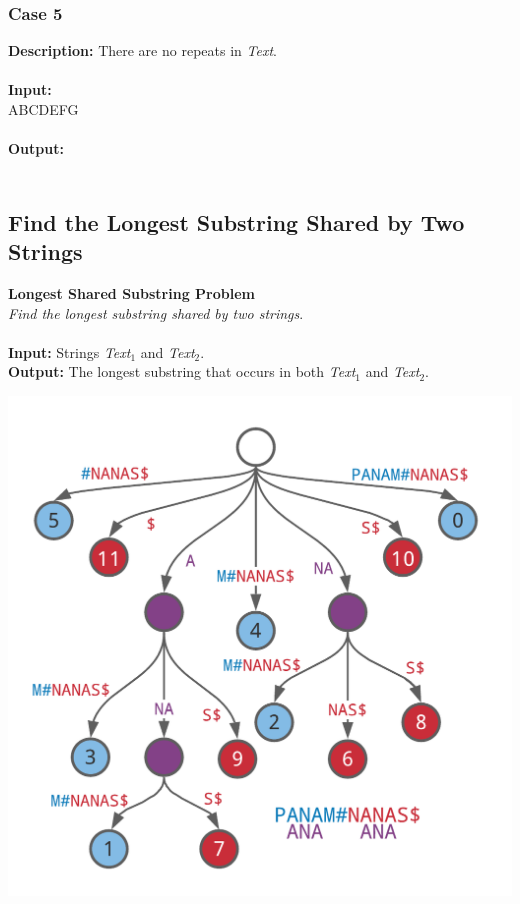 \documentclass{article}
\newcommand{\code}[1]{{\fontfamily{pcr}\selectfont #1}}
\begin{document}
\subsubsection*{Case 5}
\hline \vspace{5}
\textbf{Description:} There are no repeats in \emph{Text}.\\ \\
\noindent \textbf{Input:} \\
\code{ABCDEFG}\\ \\
\noindent \textbf{Output:}\\
\\

\pagebreak
\subsection{Find the Longest Substring Shared by Two Strings}
\hline\vspace{5}
\textbf{Longest Shared Substring Problem}\\
\emph{Find the longest substring shared by two strings}.\\ \\
\textbf{Input:} Strings \emph{Text}$_1$ and \emph{Text}$_2$.\\
\textbf{Output:} The longest substring that occurs in both \emph{Text}$_1$ and \emph{Text}$_2$.
\begin{center}
    \includegraphics[scale=0.2]{c9/logos/9E.png} 
\end{center}
\hline \vspace{5}
\end{document}
